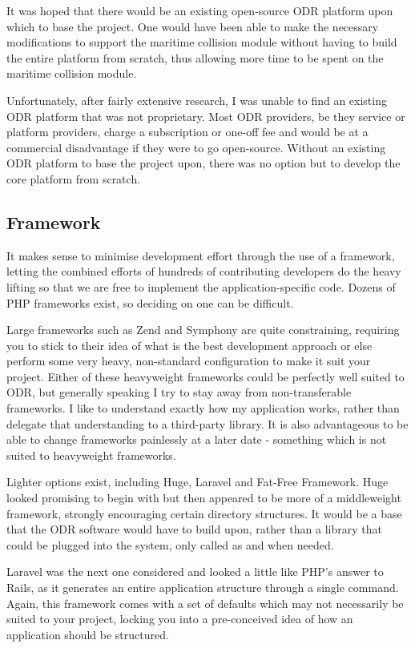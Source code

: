 It was hoped that there would be an existing open-source ODR platform upon which to base the project. One would have been able to make the necessary modifications to support the maritime collision module without having to build the entire platform from scratch, thus allowing more time to be spent on the maritime collision module.

Unfortunately, after fairly extensive research, I was unable to find an existing ODR platform that was not proprietary. Most ODR providers, be they service or platform providers, charge a subscription or one-off fee and would be at a commercial disadvantage if they were to go open-source. Without an existing ODR platform to base the project upon, there was no option but to develop the core platform from scratch.

\subsection{Framework}\label{subsection:framework}

It makes sense to minimise development effort through the use of a framework, letting the combined efforts of hundreds of contributing developers do the heavy lifting so that we are free to implement the application-specific code. Dozens of PHP frameworks exist, so deciding on one can be difficult.

Large frameworks such as Zend and Symphony are quite constraining, requiring you to stick to their idea of what is the best development approach or else perform some very heavy, non-standard configuration to make it suit your project. Either of these heavyweight frameworks could be perfectly well suited to ODR, but generally speaking I try to stay away from non-transferable frameworks. I like to understand exactly how my application works, rather than delegate that understanding to a third-party library. It is also advantageous to be able to change frameworks painlessly at a later date - something which is not suited to heavyweight frameworks.

Lighter options exist, including Huge, Laravel and Fat-Free Framework. Huge looked promising to begin with but then appeared to be more of a middleweight framework, strongly encouraging certain directory structures. It would be a base that the ODR software would have to build upon, rather than a library that could be plugged into the system, only called as and when needed.

Laravel was the next one considered and looked a little like PHP's answer to Rails, as it generates an entire application structure through a single command. Again, this framework comes with a set of defaults which may not necessarily be suited to your project, locking you into a pre-conceived idea of how an application should be structured.

